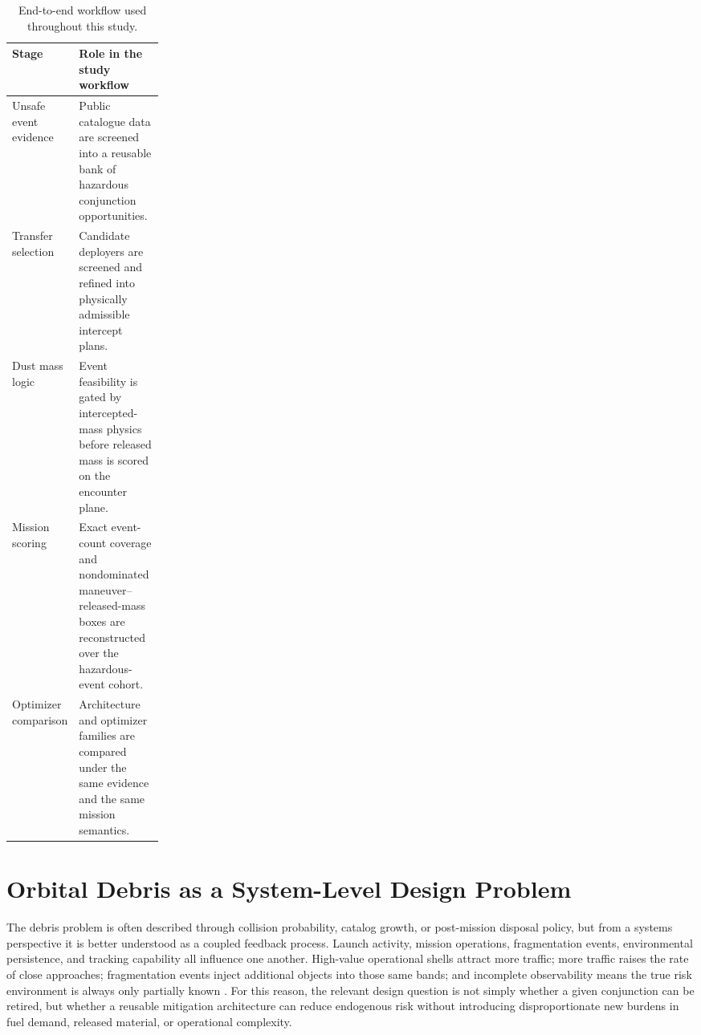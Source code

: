 \begin{table}[htb]
    \centering
    \caption[End-to-end study workflow]{End-to-end workflow used throughout this study.}
    \label{tab:intro_workflow}
    \begin{tabularx}{0.90\linewidth}{@{}L{0.22\linewidth}Y@{}}
        \toprule
        Stage & Role in the study workflow \\
        \midrule
        Unsafe event evidence & Public catalogue data are screened into a reusable bank of hazardous conjunction opportunities. \\
        Transfer selection & Candidate deployers are screened and refined into physically admissible intercept plans. \\
        Dust mass logic & Event feasibility is gated by intercepted-mass physics before released mass is scored on the encounter plane. \\
        Mission scoring & Exact event-count coverage and nondominated maneuver--released-mass boxes are reconstructed over the hazardous-event cohort. \\
        Optimizer comparison & Architecture and optimizer families are compared under the same evidence and the same mission semantics. \\
        \bottomrule
    \end{tabularx}
\end{table}

\section{Orbital Debris as a System-Level Design Problem}
The debris problem is often described through collision probability, catalog growth, or post-mission disposal policy, but from a systems perspective it is better understood as a coupled feedback process. Launch activity, mission operations, fragmentation events, environmental persistence, and tracking capability all influence one another. High-value operational shells attract more traffic; more traffic raises the rate of close approaches; fragmentation events inject additional objects into those same bands; and incomplete observability means the true risk environment is always only partially known \cite{ESAEnvironment2025,Matney2025ORDEM4,Muciaccia2024LEOCapacity}. For this reason, the relevant design question is not simply whether a given conjunction can be retired, but whether a reusable mitigation architecture can reduce endogenous risk without introducing disproportionate new burdens in fuel demand, released material, or operational complexity.

